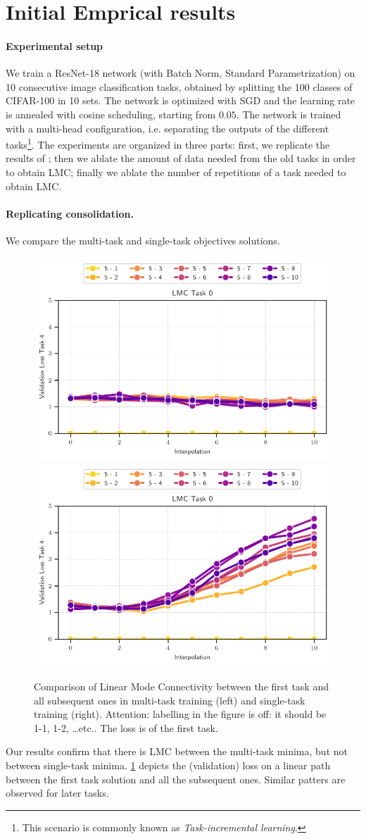\documentclass{article} %
\begin{document}
\vspace{1cm}


\section{Initial Emprical results} 


\paragraph{Experimental setup}
We train a ResNet-18 network (with Batch Norm, Standard Parametrization) on 10 consecutive image classification tasks, obtained by splitting the 100 classes of CIFAR-100 in 10 sets. The network is optimized with SGD and the learning rate is annealed with cosine scheduling, starting from $0.05$. The network is trained with a multi-head configuration, i.e. separating the outputs of the different tasks\footnote{This scenario is commonly known as \emph{Task-incremental learning}.}. The experiments are organized in three parts: first, we replicate the results of \citet{mirzadeh_linear_2020-1}; then we ablate the amount of data needed from the old tasks in order to obtain LMC; finally we ablate the number of repetitions of a task needed to obtain LMC. 

\paragraph{Replicating consolidation.} We compare the multi-task and single-task objectives solutions. 
\begin{figure}[h!]
    \centering
    \includegraphics[width=0.45\linewidth]{figures/LMC_task_0.pdf}
    \includegraphics[width=0.45\linewidth]{figures/LMC_task_0_ST.pdf}
    \caption{Comparison of Linear Mode Connectivity between the first task and all subsequent ones in multi-task training (left) and single-task training (right). \textcolor{lightred}{ Attention: labelling in the figure is off: it should be 1-1, 1-2, \dots etc.. The loss is of the first task.}}
    \label{fig:LMC-MTST}
\end{figure}
Our results confirm that there is LMC between the multi-task minima, but not between single-task minima. \cref{fig:LMC-MTST} depicts the (validation) loss on a linear path between the first task solution and all the subsequent ones. Similar patters are observed for later tasks.  
\end{document}
